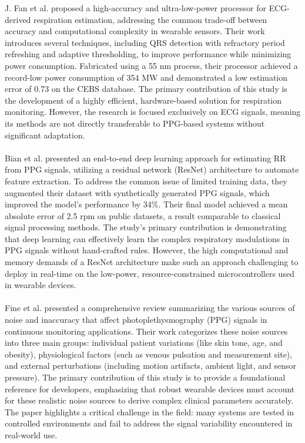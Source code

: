 \documentclass[12pt,a4paper]{report}
\begin{document}
J. Fan et al.\cite{fan2022high} proposed a high-accuracy and ultra-low-power processor for ECG-derived respiration estimation, addressing the common trade-off between accuracy and computational complexity in wearable sensors. Their work introduces several techniques, including QRS detection with refractory period refreshing and adaptive thresholding, to improve performance while minimizing power consumption. Fabricated using a 55 nm process, their processor achieved a record-low power consumption of 354 MW and demonstrated a low estimation error of 0.73 on the CEBS database. The primary contribution of this study is the development of a highly efficient, hardware-based solution for respiration monitoring. However, the research is focused exclusively on ECG signals, meaning its methods are not directly transferable to PPG-based systems without significant adaptation.\\
\\
Bian et al.\cite{bian2020respiratory} presented an end-to-end deep learning approach for estimating RR from PPG signals, utilizing a residual network (ResNet) architecture to automate feature extraction. To address the common issue of limited training data, they augmented their dataset with synthetically generated PPG signals, which improved the model's performance by 34\%. Their final model achieved a mean absolute error of 2.5 rpm on public datasets, a result comparable to classical signal processing methods. The study’s primary contribution is demonstrating that deep learning can effectively learn the complex respiratory modulations in PPG signals without hand-crafted rules. However, the high computational and memory demands of a ResNet architecture make such an approach challenging to deploy in real-time on the low-power, resource-constrained microcontrollers used in wearable devices.\\
\\
Fine et al.\cite{fine2021sources} presented a comprehensive review summarizing the various sources of noise and inaccuracy that affect photoplethysmography (PPG) signals in continuous monitoring applications. Their work categorizes these noise sources into three main groups: individual patient variations (like skin tone, age, and obesity), physiological factors (such as venous pulsation and measurement site), and external perturbations (including motion artifacts, ambient light, and sensor pressure). The primary contribution of this study is to provide a foundational reference for developers, emphasizing that robust wearable devices must account for these realistic noise sources to derive complex clinical parameters accurately. The paper highlights a critical challenge in the field: many systems are tested in controlled environments and fail to address the signal variability encountered in real-world use. \\
\end{document}
